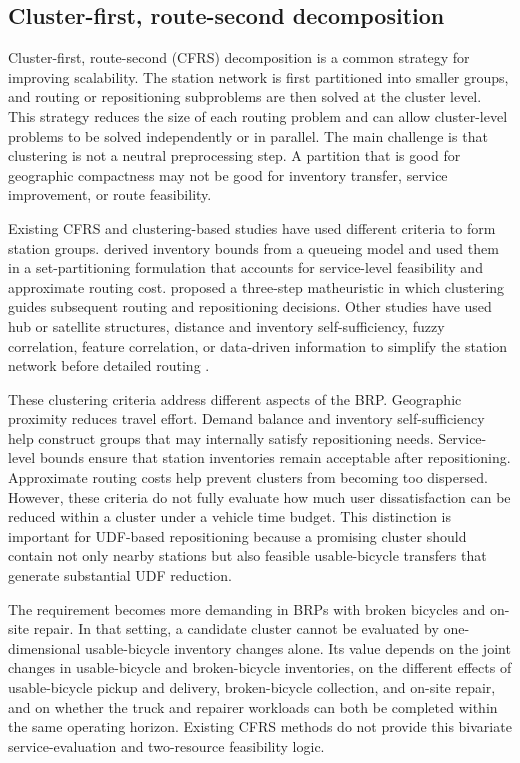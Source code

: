 \subsection{Cluster-first, route-second decomposition}

Cluster-first, route-second (CFRS) decomposition is a common strategy for improving scalability. The station network is first partitioned into smaller groups, and routing or repositioning subproblems are then solved at the cluster level. This strategy reduces the size of each routing problem and can allow cluster-level problems to be solved independently or in parallel. The main challenge is that clustering is not a neutral preprocessing step. A partition that is good for geographic compactness may not be good for inventory transfer, service improvement, or route feasibility.

Existing CFRS and clustering-based studies have used different criteria to form station groups. \citet{schuijbroekInventoryRebalancingVehicle2017} derived inventory bounds from a queueing model and used them in a set-partitioning formulation that accounts for service-level feasibility and approximate routing cost. \citet{forma3stepMathHeuristic2015} proposed a three-step matheuristic in which clustering guides subsequent routing and repositioning decisions. Other studies have used hub or satellite structures, distance and inventory self-sufficiency, fuzzy correlation, feature correlation, or data-driven information to simplify the station network before detailed routing \citep{huangStaticBikeRepositioning2020,lvHybridAlgorithmStatic2020,lvFuzzyCorrelationBased2022,lvFeatureCorrelationReinforce2024,liuDataDrivenOptimizationFramework2025}.

These clustering criteria address different aspects of the BRP. Geographic proximity reduces travel effort. Demand balance and inventory self-sufficiency help construct groups that may internally satisfy repositioning needs. Service-level bounds ensure that station inventories remain acceptable after repositioning. Approximate routing costs help prevent clusters from becoming too dispersed. However, these criteria do not fully evaluate how much user dissatisfaction can be reduced within a cluster under a vehicle time budget. This distinction is important for UDF-based repositioning because a promising cluster should contain not only nearby stations but also feasible usable-bicycle transfers that generate substantial UDF reduction.

The requirement becomes more demanding in BRPs with broken bicycles and on-site repair. In that setting, a candidate cluster cannot be evaluated by one-dimensional usable-bicycle inventory changes alone. Its value depends on the joint changes in usable-bicycle and broken-bicycle inventories, on the different effects of usable-bicycle pickup and delivery, broken-bicycle collection, and on-site repair, and on whether the truck and repairer workloads can both be completed within the same operating horizon. Existing CFRS methods do not provide this bivariate service-evaluation and two-resource feasibility logic.

